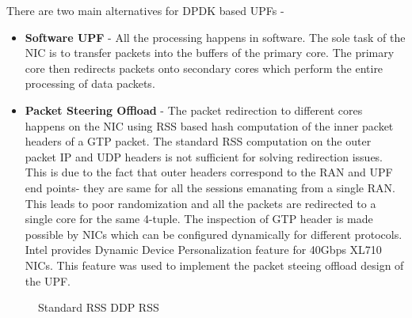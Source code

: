 There are two main alternatives for DPDK based UPFs -
\begin{itemize}
	\item \textbf{Software UPF} - All the processing happens in software. The sole task of
	      the NIC is to transfer packets into the buffers of the primary core. The primary core then
	      redirects packets onto secondary cores which perform the entire processing of data packets.
	\item \textbf{Packet Steering Offload} - The packet redirection to different cores happens on the NIC using RSS based hash
        computation of the inner packet headers of a GTP packet. The standard RSS
        computation on the outer packet IP and UDP headers is not sufficient for
        solving redirection issues. This is due to the fact that outer headers
	correspond to the RAN and UPF end points- they are same for all the sessions
	emanating from a single RAN. This leads to poor randomization and all the 
	packets are redirected to a single core for the same 4-tuple. The inspection of
	 GTP header is made possible by NICs which can be configured dynamically for
	  different protocols. Intel provides Dynamic Device Personalization \cite{ddpGuide} feature for 40Gbps XL710 NICs. This feature was used to implement the packet steeing offload design of the UPF.
\end{itemize}
\begin{figure}[htbp]
	\centering


	\caption{ Standard RSS   DDP RSS}
	\label{figure:HashFields}
\end{figure}

